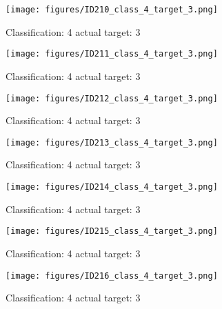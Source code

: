 \begin{figure}[h!]
\begin{center}
\texttt{[image: figures/ID210\_class\_4\_target\_3.png]}
\end{center}
\caption{ Classification: 4 actual target: 3}
\label{fig:ID210_class_4_target_3}
\end{figure}
\begin{figure}[h!]
\begin{center}
\texttt{[image: figures/ID211\_class\_4\_target\_3.png]}
\end{center}
\caption{ Classification: 4 actual target: 3}
\label{fig:ID211_class_4_target_3}
\end{figure}
\begin{figure}[h!]
\begin{center}
\texttt{[image: figures/ID212\_class\_4\_target\_3.png]}
\end{center}
\caption{ Classification: 4 actual target: 3}
\label{fig:ID212_class_4_target_3}
\end{figure}
\begin{figure}[h!]
\begin{center}
\texttt{[image: figures/ID213\_class\_4\_target\_3.png]}
\end{center}
\caption{ Classification: 4 actual target: 3}
\label{fig:ID213_class_4_target_3}
\end{figure}
\begin{figure}[h!]
\begin{center}
\texttt{[image: figures/ID214\_class\_4\_target\_3.png]}
\end{center}
\caption{ Classification: 4 actual target: 3}
\label{fig:ID214_class_4_target_3}
\end{figure}
\begin{figure}[h!]
\begin{center}
\texttt{[image: figures/ID215\_class\_4\_target\_3.png]}
\end{center}
\caption{ Classification: 4 actual target: 3}
\label{fig:ID215_class_4_target_3}
\end{figure}
\begin{figure}[h!]
\begin{center}
\texttt{[image: figures/ID216\_class\_4\_target\_3.png]}
\end{center}
\caption{ Classification: 4 actual target: 3}
\label{fig:ID216_class_4_target_3}
\end{figure}
